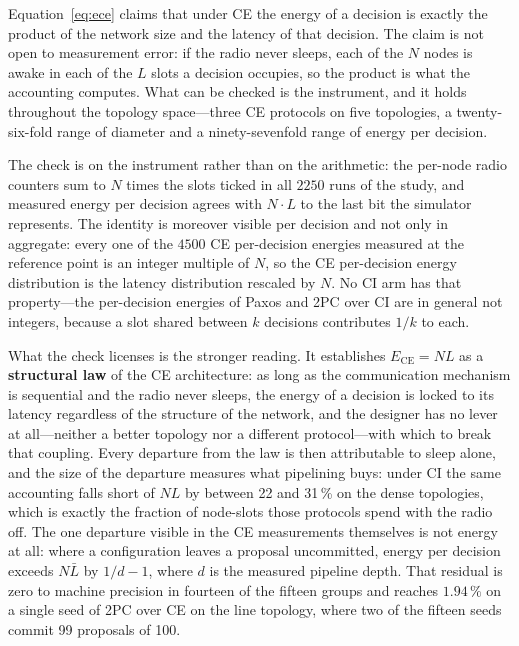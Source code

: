 \documentclass[journal]{IEEEtran}
\newcommand{\CI}{CI}                      %
\newcommand{\CE}{CE}                      %
\newcommand{\Nnodes}{N}                   %
\newcommand{\Ece}{E_{\mathrm{CE}}}        %
\begin{document}

Equation~\eqref{eq:ece} claims that under \CE{} the energy of a decision
is exactly the product of the network size and the latency of that
decision. The claim is not open to measurement error: if the radio never
sleeps, each of the $\Nnodes$ nodes is awake in each of the $L$ slots a
decision occupies, so the product is what the accounting computes. What can be
checked is the instrument, and it holds throughout the topology space---three
\CE{} protocols on five topologies, a twenty-six-fold range of diameter and a
ninety-sevenfold range of energy per decision.

The check is on the instrument rather than on the arithmetic: the per-node
radio counters sum to $\Nnodes$ times the slots ticked in all $2250$ runs of
the study, and measured energy per decision agrees with $\Nnodes \cdot L$ to
the last bit the simulator represents. The identity is moreover visible per
decision and not only in aggregate: every one of the $4500$ \CE{} per-decision
energies measured at the reference point is an integer multiple of $\Nnodes$,
so the \CE{} per-decision energy distribution is the latency distribution
rescaled by $\Nnodes$. No \CI{} arm has that property---the per-decision
energies of Paxos and 2PC over \CI{} are in general not integers, because a
slot shared between $k$ decisions contributes $1/k$ to each.

What the check licenses is the stronger reading. It establishes
$\Ece = \Nnodes L$ as a \textbf{structural law} of the \CE{} architecture: as
long as the communication mechanism is sequential and the radio never sleeps,
the energy of a decision is locked to its latency regardless of the structure
of the network, and the designer has no lever at all---neither a better
topology nor a different protocol---with which to break that coupling. Every
departure from the law is then attributable to sleep alone, and the size of the
departure measures what pipelining buys: under \CI{} the same accounting
falls short of $\Nnodes L$ by between 22 and 31\,\% on the dense topologies,
which is exactly the fraction of node-slots those protocols spend with the
radio off. The one departure visible in the \CE{} measurements themselves is
not energy at all: where a configuration leaves a proposal uncommitted, energy
per decision exceeds $\Nnodes \bar{L}$ by $1/d - 1$, where $d$ is the measured
pipeline depth. That residual is zero to machine precision in fourteen of the
fifteen groups and reaches $1.94\,\%$ on a single seed of 2PC over \CE{} on the
line topology, where two of the fifteen seeds commit 99 proposals of 100.
\end{document}
